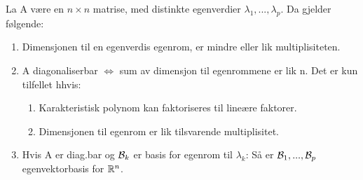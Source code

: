 La A være en $n\times n$ matrise,
med distinkte egenverdier $\lambda_1, ..., \lambda_p$.
Da gjelder følgende:
\begin{enumerate}
  \item Dimensjonen til en egenverdis egenrom,
        er mindre eller lik multiplisiteten.
  \item A diagonaliserbar $\iff$ sum av dimensjon til egenrommene er lik n.
        Det er kun tilfellet hhvis:
        \begin{enumerate}[label=\alph*]
          \item Karakteristisk polynom kan faktoriseres til lineære faktorer.
          \item Dimensjonen til egenrom er lik tilsvarende multiplisitet.
        \end{enumerate}
  \item Hvis A er diag.bar og $\mathcal{B}_k$ er basis for egenrom til $\lambda_k$:
        Så er $\mathcal{B}_1, ..., \mathcal{B}_p$ egenvektorbasis for $\mathbb{R}^n$.
\end{enumerate}
